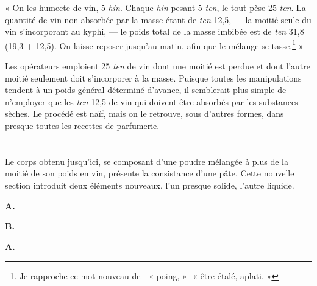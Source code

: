 \documentclass[a4paper, 11pt, oneside]{article}
\newcommand*\hieroAAAM{}
\newcommand*\hieroAAAN{}
\newcommand*\hieroAAFT{}
\newcommand*\hieroAAGN{}
\newcommand*\hieroAAGP{}
\newcommand*\hieroAAHC{\raisebox{1ex}{}}
\newcommand*\hieroAAIG{}
\newcommand*\hieroAAIT{}
\newcommand*\hieroAAIU{}
\newcommand*\hieroAALO{}
\newcommand*\hieroAALP{}
\newcommand*\hieroAAMQ{}
\newcommand*\hieroAANF{}
\newcommand*\hieroAANN{}
\newcommand*\hieroAANO{}
\newcommand*\hieroAANP{}
\newcommand*\hieroAANQ{}
\newcommand*\hieroAANR{}
\newcommand*\hieroAANS{}
\newcommand*\hieroAANT{}
\newcommand*\hieroAANU{}
\newcommand*\hieroAANV{}
\newcommand*\hieroAANW{}
\newcommand*\hieroAANX{}
\newcommand*\hieroAANY{}
\newcommand*\hieroAANZ{}
\newcommand*\hieroAAOA{}
\newcommand*\hieroAAOB{}
\newcommand*\hieroAAOC{}
\newcommand*\hieroAAOD{}
\newcommand*\hieroAAOE{\raisebox{0.6ex}{}}
\newcommand*\hieroAAOF{}
\newcommand*\hieroAAOG{\raisebox{0.4ex}{}}
\newcommand*\hieroAAOH{}
\begin{document}
« On les humecte de vin, 5 \emph{hin}. Chaque \emph{hin} pesant 5 \emph{ten}, le tout pèse 25 \emph{ten}. La quantité de vin non absorbée par la masse étant de \emph{ten} 12,5, --- la moitié seule du vin s'incorporant au kyphi, --- le poids total de la masse imbibée est de \emph{ten} 31,8 (19,3 + 12,5). On laisse reposer jusqu'au matin, afin que le mélange se tasse.\footnote{Je rapproche ce mot nouveau de $\hieroAAOF\:\hieroAAOG$ « poing, » $\hieroAAOH$ « être étalé, aplati. »} »

Les opérateurs emploient 25 \emph{ten} de vin dont une moitié est perdue et dont l'autre moitié seulement doit s'incorporer à la masse. Puisque toutes les manipulations tendent à un poids général déterminé d'avance, il semblerait plus simple de n'employer que les \emph{ten} 12,5 de vin qui doivent être absorbés par les substances sèches. Le procédé est naïf, mais on le retrouve, sous d'autres formes, dans presque toutes les recettes de parfumerie.
\clearpage
\section{}
\paragraph{}
Le corps obtenu jusqu'ici, se composant d'une poudre mélangée à plus de la moitié de son poids en vin, présente la consistance d'une pâte. Cette nouvelle section introduit deux éléments nouveaux, l'un presque solide, l'autre liquide.

\hspace*{10mm}\textbf{A.}\hspace*{5mm} $\hieroAANN\:\hieroAAAN\:\hieroAANO\:\hieroAANO\:\hieroAANP\:\hieroAANQ\:\hieroAANF\:\hieroAAIG\:\hieroAAIT\:\hieroAAMQ$ \hspace*{7mm} $\hieroAANR\:\hieroAANS\:\hieroAAHC\:\hieroAALO$

\hspace*{10mm}\textbf{B.}\hspace*{5mm} $\hieroAAAM\:\hieroAANT\:\hieroAANU\:\hieroAANV\:\hieroAANW\:\hieroAANQ\:\hieroAANF\:\hieroAAIG\:\hieroAAGN\:\hieroAAFT\:\hieroAAMQ$ \hspace*{5mm} $\hieroAANR\:\hieroAANX\:\hieroAANS\:\hieroAALO$

\hspace*{10mm}\textbf{A.}\hspace*{5mm} $\hieroAAIT\:\hieroAAIU\:\hieroAANY\:\hieroAAIT\:\hieroAAMQ\:\hieroAALP$ \hspace*{8mm} $\hieroAAGP\:\hieroAANZ\:\hieroAAOA\:\hieroAAOB\:\hieroAAOC\:\hieroAAOD\:\hieroAAOE$
\end{document}
